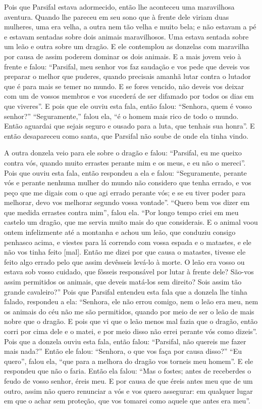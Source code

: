 Pois que Parsifal estava adormecido, então lhe aconteceu uma maravilhosa
aventura. Quando lhe pareceu em seu sono que à frente dele viriam duas
mulheres, uma era velha, a outra nem tão velha e muito bela; e não estavam a pé
e estavam sentadas sobre dois animais maravilhosos. Uma estava sentada sobre um
leão e outra sobre um dragão. E ele contemplou as donzelas com maravilha por
causa de assim poderem dominar os dois animais. E a mais jovem veio à frente e
falou: “Parsifal, meu senhor vos faz saudação e vos pede que deveis vos
preparar  o melhor que puderes, quando precisais amanhã lutar contra o lutador
que é para mais se temer no mundo. E se fores vencido, não deveis vos deixar
com um de vossos membros e vos sucederá de ser difamado por todos os dias em
que viveres”. E pois que ele ouviu esta fala, então falou: “Senhora, quem é
vosso senhor?” “Seguramente,” falou ela, “é o homem mais rico de todo o mundo.
Então aguardai que sejais seguro e ousado para a luta, que tenhais sua honra”.
E então desapareceu como santa, que Parsifal não soube de onde ela tinha
vindo.

A outra donzela veio para ele sobre o dragão e falou: “Parsifal, eu me
queixo contra vós, quando muito errastes perante mim e os meus, e eu não o
mereci”. Pois que ouviu esta fala, então respondeu a ela e falou: “Seguramente,
perante vós e perante nenhuma mulher do mundo não considero que tenha errado, e
vos peço que me digais com o que agi errado perante vós; e se eu tiver poder
para melhorar, devo vos melhorar segundo vossa vontade”. “Quero bem vos dizer
em que medida errastes contra mim”, falou ela. “Por longo tempo criei em meu
castelo um dragão, que me servia muito mais do que considerais. E o animal voou
ontem infelizmente até a montanha e achou um leão, que conduziu consigo
penhasco acima, e viestes para lá correndo com vossa espada e o matastes, e ele
não vos tinha feito [mal]. Então me dizei por que causa o matastes, tivesse ele feito
algo errado pelo que assim devêsseis levá-lo à morte. O leão era vosso ou
estava sob vosso cuidado, que fôsseis responsável por lutar à frente dele?
São-vos assim permitidos os animais, que deveis matá-los sem direito? Sois
assim tão grande cavaleiro?” Pois que Parsifal entendeu esta
fala que a donzela lhe tinha falado, respondeu a ela: “Senhora, ele não errou
comigo, nem o leão era meu, nem os animais do céu não me são permitidos, quando
por meio de ser o leão de mais nobre que o dragão. E pois que vi que o leão
menos mal fazia que o dragão, então corri por cima dele e o matei, e por meio
disso não errei perante vós como dizeis”. Pois que a donzela ouviu esta fala,
então falou: “Parsifal, não quereis me fazer mais nada?” Então ele falou:
“Senhora, o que vos faça por causa disso?'' “Eu quero”, falou ela, “que para a
melhora do dragão vos torneis meu homem”. E ele respondeu que não o faria.
Então ela falou: “Mas o fostes; antes de receberdes o feudo de vosso senhor,
éreis meu. E por causa de que éreis antes meu que de um outro, assim não quero
renunciar a vós e vos quero assegurar: em qualquer lugar em que o achar sem
proteção, que vos tomarei como aquele que antes era meu”. 

